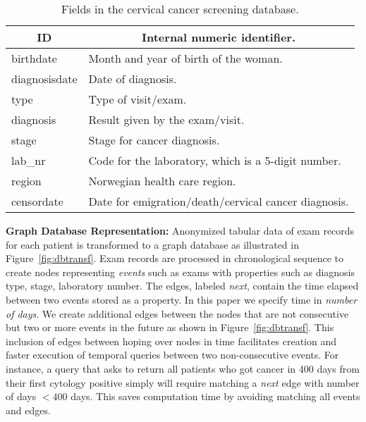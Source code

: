 \documentclass[10pt, conference]{IEEEtran}
\begin{document}
\begin{table}[]
\centering
\caption{Fields in the cervical cancer screening database.}
\label{tab:record}
\begin{tabular}{@{}ll@{}}
\toprule
\multicolumn{1}{c}{ID}             & \multicolumn{1}{c}{Internal numeric identifier.}     \\ \midrule
\multicolumn{1}{l|}{birthdate}     & Month and year of birth of the woman.                \\
\multicolumn{1}{l|}{diagnosisdate} & Date of diagnosis.                                   \\
\multicolumn{1}{l|}{type}          & Type of visit/exam.                                  \\
\multicolumn{1}{l|}{diagnosis}     & Result given by the exam/visit.                      \\
\multicolumn{1}{l|}{stage}         & Stage for cancer diagnosis.                          \\
\multicolumn{1}{l|}{lab\_nr}       & Code for the laboratory, which is a 5-digit number.  \\
\multicolumn{1}{l|}{region}        & Norwegian health care region.                        \\
\multicolumn{1}{l|}{censordate}    & Date for emigration/death/cervical cancer diagnosis. \\ \bottomrule
\end{tabular}

\end{table}
	
\noindent \textbf{Graph Database Representation:} Anonymized tabular data of exam records for each patient is transformed to a graph database as illustrated in Figure~\ref{fig:dbtransf}. Exam records are processed in chronological sequence to create nodes representing \emph{events} such as exams with properties such as diagnosis type, stage, laboratory number. The edges, labeled \emph{next}, contain the time elapsed between two events stored as a property. In this paper we specify time in \emph{number of days}. We create additional edges between the nodes that are not consecutive but two or more events in the future as shown in Figure~\ref{fig:dbtransf}. This inclusion of edges between hoping over  nodes in time facilitates creation and faster execution of temporal queries between two non-consecutive events. For instance, a query that asks to return all patients who got cancer in 400 days from their first cytology positive simply will require matching a \emph{next} edge with number of days $<400$ days. This saves computation time by avoiding matching  all events and edges.
\end{document}
